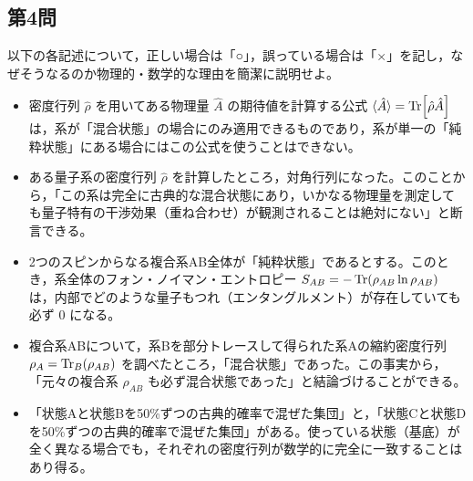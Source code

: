 \documentclass[dvipdfmx,b5paper,twoside]{jsarticle}
\begin{document}
\subsection*{第4問}
以下の各記述について，正しい場合は「○」，誤っている場合は「×」を記し，なぜそうなるのか物理的・数学的な理由を簡潔に説明せよ。
\begin{itemize}
  \item[(1)] 密度行列 $\hat{\rho}$ を用いてある物理量 $\hat{A}$ の期待値を計算する公式 $\langle \hat{A} \rangle = \Tr[\hat{\rho}\hat{A}]$ は，系が「混合状態」の場合にのみ適用できるものであり，系が単一の「純粋状態」にある場合にはこの公式を使うことはできない。
  \item[(2)] ある量子系の密度行列 $\hat{\rho}$ を計算したところ，対角行列になった。このことから，「この系は完全に古典的な混合状態にあり，いかなる物理量を測定しても量子特有の干渉効果（重ね合わせ）が観測されることは絶対にない」と断言できる。
  \item[(3)] 2つのスピンからなる複合系AB全体が「純粋状態」であるとする。このとき，系全体のフォン・ノイマン・エントロピー $S_{AB} = -\Tr(\rho_{AB} \ln \rho_{AB})$ は，内部でどのような量子もつれ（エンタングルメント）が存在していても必ず $0$ になる。
  \item[(4)] 複合系ABについて，系Bを部分トレースして得られた系Aの縮約密度行列 $\rho_A = \Tr_B(\rho_{AB})$ を調べたところ，「混合状態」であった。この事実から，「元々の複合系 $\rho_{AB}$ も必ず混合状態であった」と結論づけることができる。
  \item[(5)] 「状態Aと状態Bを50\%ずつの古典的確率で混ぜた集団」と，「状態Cと状態Dを50\%ずつの古典的確率で混ぜた集団」がある。使っている状態（基底）が全く異なる場合でも，それぞれの密度行列が数学的に完全に一致することはあり得る。
\end{itemize}
\end{document}
